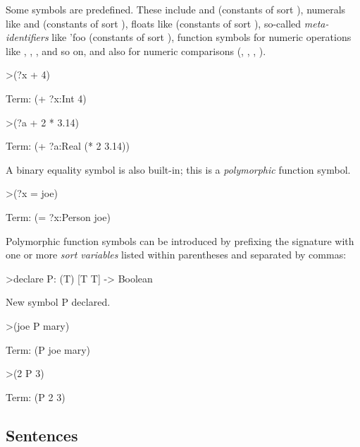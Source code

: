 Some symbols are predefined. These include  and  (constants of sort ), numerals like  and  (constants of sort ),
floats        like  (constants of sort ), so-called \emph{meta-identifiers} like {\ttfamily 'foo} (constants of sort ), function symbols for numeric operations like \mtt{+}, \mtt{-}, \mtt{*}, and so on,
and also for numeric comparisons (\mtt{<}, \mtt{>}, \mtt{<=}, \mtt{>=}). 
\begin{tcAthena}[upquote=true]
>(?x + 4)

Term: (+ ?x:Int 4)

>(?a + 2 * 3.14)

Term: (+ ?a:Real
         (* 2 3.14))
\end{tcAthena}
A binary equality symbol is also built-in; this is a \emph{polymorphic} function symbol. 
\begin{tcAthena}[upquote=true]
>(?x = joe)

Term: (= ?x:Person joe)
\end{tcAthena}
Polymorphic function symbols can be introduced by prefixing the signature with one or more {\em sort variables\/} listed within parentheses and separated by commas: 

\begin{tcAthena}[upquote=true]
>declare P: (T) [T T] -> Boolean

New symbol P declared.

>(joe P mary)

Term: (P joe mary)

>(2 P 3)

Term: (P 2 3)
\end{tcAthena}

\subsection{Sentences} 

